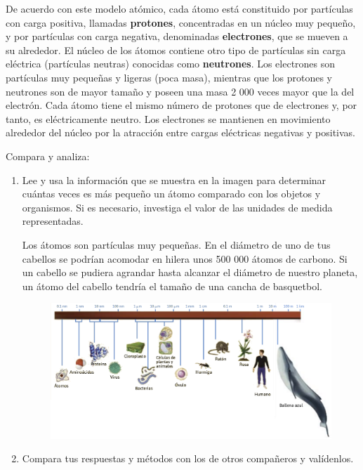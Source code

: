 \documentclass[11pt]{book}
\begin{document}
De acuerdo con este modelo atómico, cada átomo está constituido por partículas
con carga positiva, llamadas \textbf{protones}, concentradas en un núcleo muy pequeño, y por
partículas con carga negativa, denominadas \textbf{electrones}, que se mueven a su alrededor.
El núcleo de los átomos contiene otro tipo de partículas sin carga eléctrica (partículas
neutras) conocidas como \textbf{neutrones}. Los electrones son partículas muy pequeñas y
ligeras (poca masa), mientras que los protones y neutrones son de mayor tamaño y
poseen una masa 2 000 veces mayor que la del electrón. Cada átomo tiene el mismo
número de protones que de electrones y, por tanto, es eléctricamente neutro. Los electrones
se mantienen en movimiento alrededor del núcleo por la atracción entre cargas
eléctricas negativas y positivas.


\begin{boxK}
  Compara y analiza:\\
  \begin{enumerate}
    \item Lee y usa la información que se muestra en la imagen para determinar cuántas
          veces es más pequeño un átomo comparado con los objetos y organismos. Si es
          necesario, investiga el valor de las unidades de medida representadas.
          \begin{boxF}
            Los átomos son partículas muy pequeñas. En el diámetro de uno de tus cabellos se podrían
            acomodar en hilera unos 500 000 átomos de carbono. Si un cabello se pudiera agrandar
            hasta alcanzar el diámetro de nuestro planeta, un átomo del cabello tendría el tamaño de
            una cancha de basquetbol.
          \end{boxF}

          \begin{figure}[H]
            \centering
            \includegraphics[width=.8\textwidth]{escala.png}
          \end{figure}


    \item Compara tus respuestas y métodos con los de otros compañeros y valídenlos.
  \end{enumerate}
\end{boxK}
\end{document}
